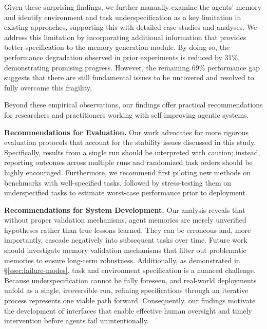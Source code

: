\documentclass{article}
\begin{document}
Given these surprising findings, we further manually examine the agents' memory and identify environment and task underspecification as a key limitation in existing approaches, supporting this with detailed case studies and analyses. We address this limitation by incorporating additional information that provides better specification to the memory generation module. By doing so, the performance degradation observed in prior experiments is reduced by 31\%, demonstrating promising progress. However, the remaining 69\% performance gap suggests that there are still fundamental issues to be uncovered and resolved to fully overcome this fragility.

Beyond these empirical observations, our findings offer practical recommendations for researchers and practitioners working with self-improving agentic systems.

\textbf{Recommendations for Evaluation.}
Our work advocates for more rigorous evaluation protocols that account for the stability issues discussed in this study. Specifically, results from a single run should be interpreted with caution; instead, reporting outcomes across multiple runs and randomized task orders should be highly encouraged. Furthermore, we recommend first piloting new methods on benchmarks with well-specified tasks, followed by stress-testing them on underspecified tasks to estimate worst-case performance prior to deployment.

\textbf{Recommendations for System Development.}
Our analysis reveals that without proper validation mechanisms, agent memories are merely unverified hypotheses rather than true lessons learned. They can be erroneous and, more importantly, cascade negatively into subsequent tasks over time. Future work should investigate memory validation mechanisms that filter out problematic memories to ensure long-term robustness.
Additionally, as demonstrated in \S\ref{ssec:failure-modes}, task and environment specification is a nuanced challenge. Because underspecification cannot be fully foreseen, and real-world deployments unfold as a single, irreversible run, refining specifications through an iterative process represents one viable path forward. Consequently, our findings motivate the development of interfaces that enable effective human oversight and timely intervention before agents fail unintentionally.

\end{document}
